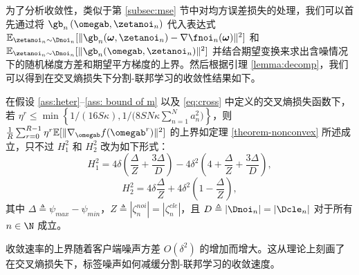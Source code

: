 为了分析收敛性，类似于第 \ref{subsec:mse} 节中对均方误差损失的处理，我们可以首先通过将 $\gb_n\left(\omegab,\zetanoi_n\right)$ 代入表达式 $\mathbb{E}_{\zetanoi_n\sim \Dnoi_n}[\Vert \gb_n(\boldsymbol{\omega},\zetanoi_n) - \nabla \fnoi_n(\boldsymbol{\omega}) \Vert^2 ]$ 和 $\mathbb{E}_{\zetanoi_n\sim \Dnoi_n}[\Vert \gb_n(\omegab, \zetanoi_n) \Vert^2]$ 并结合期望变换来求出含噪情况下的随机梯度方差和期望平方梯度的上界。然后根据引理 \ref{lemma:decomp}，我们可以得到在交叉熵损失下分割-联邦学习的收敛性结果如下。

\begin{theorem}[交叉熵损失下的收敛性]\label{thm:cross-entropy}
在假设 \ref{ass:heter}--\ref{ass: bound of m} 以及 \eqref{eq:cross} 中定义的交叉熵损失函数下，若 $\eta^r \leq \min\left\{ {1}/{(16S\kappa)},  {1}/{(8SN\kappa\sum_{n=1}^Na_n^2})\right\}$，则 $\frac{1}{R}\sum_{r=0}^{R-1}\eta^r\mathbb{E}[\Vert\nabla_{\omegab}f(\omegab^{r})\Vert^2]$ 的上界如定理 \ref{theorem-nonconvex} 所述成立，只不过 $H_1^2$ 和 $H^2_2$ 改为如下形式：
\begin{equation}\label{eq:H}
    H_1^2=4\delta\left(\frac{\Delta}{Z}+\frac{3\Delta}{D}\right)
    -4\delta^2\left(4+\frac{\Delta}{Z}+\frac{3\Delta}{D}\right),
\end{equation}
\begin{equation}\label{eq:H}
    H_2^2 =4\delta\frac{\Delta}{Z}+4\delta^2\left(1-\frac{\Delta}{Z}\right),
\end{equation}
其中 $\Delta \triangleq \psi_{max}-\psi_{min}$，$Z \triangleq |\zeta_n^{noi}| = |\zeta_n^{cle}|$，且 $D\triangleq |\Dnoi_n|=|\Dcle_n|$ 对于所有 $n\in\N$ 成立。
\end{theorem}

收敛速率的上界随着客户端噪声方差 $O(\delta^2)$ 的增加而增大。这从理论上刻画了在交叉熵损失下，标签噪声如何减缓分割-联邦学习的收敛速度。

